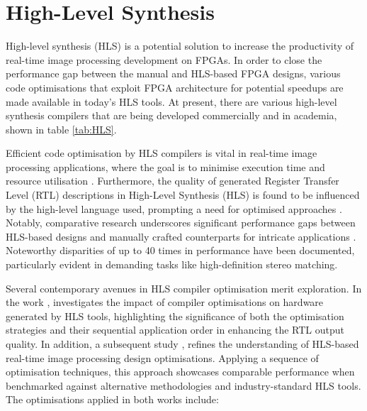 \section{High-Level Synthesis}


High-level synthesis (HLS) is a potential solution to increase the productivity of real-time image processing development on FPGAs. In order to close the performance gap between the manual and HLS-based FPGA designs, various code optimisations that exploit FPGA architecture for potential speedups are made available in today’s HLS tools.  At present, there are various high-level synthesis compilers that are being developed commercially and in academia, shown in table \ref{tab:HLS}.


Efficient code optimisation by HLS compilers is vital in real-time image processing applications, where the goal is to minimise execution time and resource utilisation \cite{SolJinSen19}. Furthermore, the quality of generated Register Transfer Level (RTL) descriptions in High-Level Synthesis (HLS) is found to be influenced by the high-level language used, prompting a need for optimised approaches \cite{ConLiuPra12}. Notably, comparative research underscores significant performance gaps between HLS-based designs and manually crafted counterparts for intricate applications \cite{JasMuhYi11,RupLiaLi11,LiaRupLi12}. Noteworthy disparities of up to 40 times in performance have been documented, particularly evident in demanding tasks like high-definition stereo matching.

Several contemporary avenues in HLS compiler optimisation merit exploration. In the work \cite{HuaLiaCan13}, investigates the impact of compiler optimisations on hardware generated by HLS tools, highlighting the significance of both the optimisation strategies and their sequential application order in enhancing the RTL output quality. In addition, a subsequent study \cite{ChaYanBen17}, refines the understanding of HLS-based real-time image processing design optimisations. Applying a sequence of optimisation techniques, this approach showcases comparable performance when benchmarked against alternative methodologies and industry-standard HLS tools. The optimisations applied in both works include:

